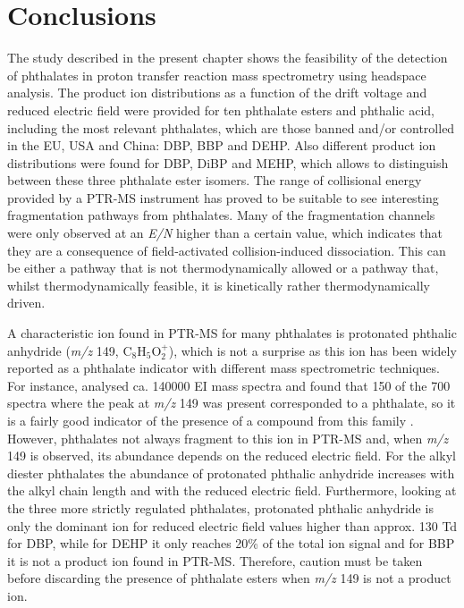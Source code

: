 \section{Conclusions}
The study described in the present chapter shows the feasibility of the detection of phthalates in proton transfer reaction mass spectrometry using headspace analysis. 
%
The product ion distributions as a function of the drift voltage and reduced electric field were provided for ten phthalate esters and phthalic acid, including the most relevant phthalates, which are those banned and/or controlled in the EU, USA and China: DBP, BBP and DEHP.
%
Also different product ion distributions were found for  DBP, DiBP and MEHP, which allows to distinguish between these three phthalate ester isomers.
%
The range of collisional energy provided by a PTR-MS instrument has proved to be suitable to see interesting fragmentation pathways from phthalates.
%
Many of the fragmentation channels were only observed at an \textit{E/N} higher than a certain value, which indicates that they are a consequence of field-activated collision-induced dissociation.
%
This can be either a pathway that is not thermodynamically allowed or a pathway that, whilst thermodynamically feasible, it is kinetically rather thermodynamically driven.


A characteristic ion found in PTR-MS for many phthalates is protonated phthalic anhydride (\textit{m/z} 149, C$_8$H$_5$O$_2^+$), which is not a surprise as this ion has been widely reported as a phthalate indicator with different mass spectrometric techniques. 
For instance, \citeauthor{mclafferty1989registry} analysed  ca. 140000  EI mass spectra and found that 150 of the 700 spectra where the peak at \textit{m/z} 149  was present corresponded to a phthalate,  so it is a fairly good indicator of the presence of a compound from this family \cite{mclafferty1993interpretation,mclafferty1989registry}. 
%
However, phthalates not always fragment to this ion in PTR-MS and, when \textit{m/z} 149 is observed, its abundance depends on  the reduced electric field. For the alkyl diester phthalates the abundance of protonated phthalic anhydride  increases with the alkyl chain length and with the reduced electric field.
%
Furthermore, looking at the three more strictly regulated phthalates, protonated phthalic anhydride is only the dominant ion for reduced electric field values higher than approx. 130 Td for DBP, while for DEHP it  only reaches  20\% of the total ion signal and for BBP it is not a product ion found in PTR-MS.
%
Therefore, %
caution must be taken before discarding the presence of phthalate esters when \textit{m/z} 149 is not a product ion.





